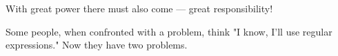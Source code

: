 \documentclass[14pt]{beamer}
\begin{document}

\begin{frame}
\begin{exampleblock}{}
  {\large With great power there must also come — great responsibility!}
    \vskip3mm
    \hspace*{}
\end{exampleblock}
\begin{exampleblock}{}
  {\large Some people, when confronted with a problem, think "I know, I'll use regular expressions."  Now they have two problems.}
    \vskip3mm
    \hspace*{}
\end{exampleblock}
\end{frame}
\end{document}

